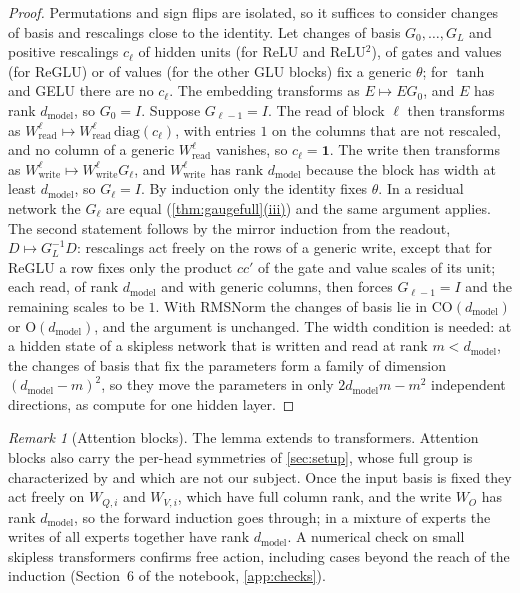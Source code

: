 \documentclass[10pt]{article}
\theoremstyle{definition}
\theoremstyle{remark}
\newtheorem{remark}[theorem]{Remark}
\newcommand{\Wread}{W_{\mathrm{read}}}
\newcommand{\Wwrite}{W_{\mathrm{write}}}
\newcommand{\dm}{d_{\mathrm{model}}}
\newcommand{\Ort}{\mathrm{O}}
\newcommand{\CO}{\mathrm{CO}}
\DeclareRobustCommand{\cpref}[2]{\hyperref[#1:#2]{\cref*{#1}(#2)}}
\begin{document}
\begin{proof}
Permutations and sign flips are isolated, so it suffices to consider changes of basis and rescalings close to the identity. Let changes of basis $G_0, \dots, G_L$ and positive rescalings $c_\ell$ of hidden units (for ReLU and ReLU$^2$), of gates and values (for ReGLU) or of values (for the other GLU blocks) fix a generic $\theta$; for $\tanh$ and GELU there are no $c_\ell$. The embedding transforms as $E \mapsto EG_0$, and $E$ has rank $\dm$, so $G_0 = I$. Suppose $G_{\ell-1} = I$. The read of block $\ell$ then transforms as $\Wread^\ell \mapsto \Wread^\ell\,\mathrm{diag}(c_\ell)$, with entries $1$ on the columns that are not rescaled, and no column of a generic $\Wread^\ell$ vanishes, so $c_\ell = \mathbf 1$. The write then transforms as $\Wwrite^\ell \mapsto \Wwrite^\ell G_\ell$, and $\Wwrite^\ell$ has rank $\dm$ because the block has width at least $\dm$, so $G_\ell = I$. By induction only the identity fixes $\theta$. In a residual network the $G_\ell$ are equal (\cpref{thm:gaugefull}{iii}) and the same argument applies. The second statement follows by the mirror induction from the readout, $D \mapsto G_L^{-1}D$: rescalings act freely on the rows of a generic write, except that for ReGLU a row fixes only the product $cc'$ of the gate and value scales of its unit; each read, of rank $\dm$ and with generic columns, then forces $G_{\ell-1} = I$ and the remaining scales to be $1$. With RMSNorm the changes of basis lie in $\CO(\dm)$ or $\Ort(\dm)$, and the argument is unchanged. The width condition is needed: at a hidden state of a skipless network that is written and read at rank $m < \dm$, the changes of basis that fix the parameters form a family of dimension $(\dm-m)^2$, so they move the parameters in only $2\dm m - m^2$ independent directions, as \citet[Proposition~C.3]{zhao2023symmetries} compute for one hidden layer.
\end{proof}

\begin{remark}[Attention blocks]\label{rem:attnfree}
The lemma extends to transformers. Attention blocks also carry the per-head symmetries of \cref{sec:setup}, whose full group is characterized by \citet{wang2025gauge} and which are not our subject. Once the input basis is fixed they act freely on $W_{Q,i}$ and $W_{V,i}$, which have full column rank, and the write $W_O$ has rank $\dm$, so the forward induction goes through; in a mixture of experts the writes of all experts together have rank $\dm$. A numerical check on small skipless transformers confirms free action, including cases beyond the reach of the induction (Section~6 of the notebook, \cref{app:checks}).
\end{remark}
\end{document}

